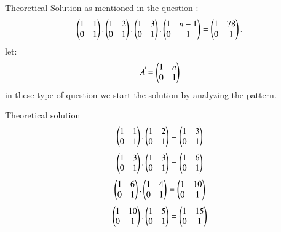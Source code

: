 \documentclass{beamer}
\begin{document}
\begin{frame}{Theoretical Solution}
as mentioned in the question :
\\
\begin{align*}
    \begin{pmatrix}1&1\\0&1\end{pmatrix}.\begin{pmatrix}1&2\\0&1\end{pmatrix}.\begin{pmatrix}1&3\\0&1\end{pmatrix}.\begin{pmatrix}1&n-1\\0&1\end{pmatrix}=\begin{pmatrix}1&78\\0&1\end{pmatrix}.
\end{align*}
let:
\begin{equation*}
   \Vec{A}=\begin{pmatrix}1&n\\0&1\end{pmatrix}
\end{equation*}
in these type of question we start the solution by analyzing the pattern. 
\end{frame}
\begin{frame}{Theoretical solution}
\begin{align*}
    \begin{pmatrix}1&1\\0&1\end{pmatrix}.\begin{pmatrix}1&2\\0&1\end{pmatrix}=\begin{pmatrix}1&3\\0&1\end{pmatrix}
\end{align*}
\begin{align*}
   \begin{pmatrix}1&3\\0&1\end{pmatrix}.\begin{pmatrix}1&3\\0&1\end{pmatrix}=\begin{pmatrix}1&6\\0&1\end{pmatrix}
\end{align*}
\begin{align*}
   \begin{pmatrix}1&6\\0&1\end{pmatrix}.\begin{pmatrix}1&4\\0&1\end{pmatrix}=\begin{pmatrix}1&10\\0&1\end{pmatrix}
\end{align*}
\begin{align*}
   \begin{pmatrix}1&10\\0&1\end{pmatrix}.\begin{pmatrix}1&5\\0&1\end{pmatrix}=\begin{pmatrix}1&15\\0&1\end{pmatrix}
\end{align*}
\end{frame}
\end{document}

